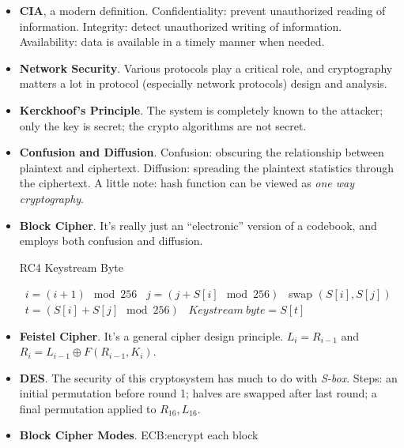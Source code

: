 \documentclass[twocolumn]{article}
\begin{document}
\begin{itemize}
\item \textbf{CIA}, a modern definition. Confidentiality: prevent
  unauthorized reading of information. Integrity: detect unauthorized
  writing of information. Availability: data is available in a timely
  manner when needed. 
\item \textbf{Network Security}. Various protocols play a critical
  role, and cryptography matters a lot in protocol (especially network
  protocols) design and analysis.
\item \textbf{Kerckhoof's Principle}. The system is completely known
  to the attacker; only the key is secret; the crypto algorithms are
  not secret. 
\item \textbf{Confusion and Diffusion}. Confusion: obscuring the
  relationship between plaintext and ciphertext. Diffusion: spreading
  the plaintext statistics through the ciphertext. A little note: hash
  function can be viewed as \emph{one way cryptography}.
\item \textbf{Block Cipher}. It's really just an ``electronic''
  version of a codebook, and employs both confusion and diffusion. 
  \begin{algorithm}
    \caption{RC4 Keystream Byte}
    \label{algo:rc4-keystream-byte}
    \begin{algorithmic}
      \STATE~$i=(i+1)\mod 256$
      \STATE~$j=(j+S[i]\mod 256)$
      \STATE~swap $(S[i], S[j])$
      \STATE~$t=(S[i]+S[j]\mod 256)$
      \STATE~$Keystream~ byte=S[t]$
    \end{algorithmic}
  \end{algorithm}
\item \textbf{Feistel Cipher}. It's a general cipher design
  principle. $L_{i}=R_{i-1}$ and $R_{i}=L_{i-1}\oplus
  F(R_{i-1},K_{i})$.
\item \textbf{DES}. The security of this cryptosystem has much to do
  with \emph{S-box}. Steps: an initial permutation before round 1;
  halves are swapped after last round; a final permutation applied to
  $R_{16},L_{16}$. 
\item \textbf{Block Cipher Modes}. ECB:\@ encrypt each block

\end{itemize}
\end{document}
